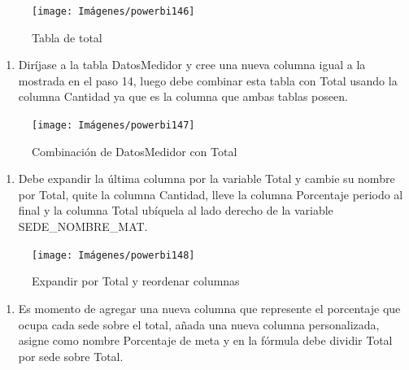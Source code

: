 \documentclass[
]{book}
\providecommand{\tightlist}{%
  \setlength{\itemsep}{0pt}\setlength{\parskip}{0pt}}
\begin{document}
\begin{figure}

{\centering \texttt{[image: Imágenes/powerbi146]} 

}

\caption{Tabla de total}\label{fig:tabladetotal-fig}
\end{figure}

\begin{enumerate}
\def\labelenumi{\arabic{enumi}.}
\setcounter{enumi}{15}
\tightlist
\item
  Diríjase a la tabla DatosMedidor y cree una nueva columna igual a la mostrada en el paso 14, luego debe combinar esta tabla con Total usando la columna Cantidad ya que es la columna que ambas tablas poseen.
\end{enumerate}

\begin{figure}

{\centering \texttt{[image: Imágenes/powerbi147]} 

}

\caption{Combinación de DatosMedidor con Total}\label{fig:combinardatoscontotal-fig}
\end{figure}

\begin{enumerate}
\def\labelenumi{\arabic{enumi}.}
\setcounter{enumi}{16}
\tightlist
\item
  Debe expandir la última columna por la variable Total y cambie su nombre por Total, quite la columna Cantidad, lleve la columna Porcentaje periodo al final y la columna Total ubíquela al lado derecho de la variable SEDE\_NOMBRE\_MAT.
\end{enumerate}

\begin{figure}

{\centering \texttt{[image: Imágenes/powerbi148]} 

}

\caption{Expandir por Total y reordenar columnas}\label{fig:expandirportotal-fig}
\end{figure}

\begin{enumerate}
\def\labelenumi{\arabic{enumi}.}
\setcounter{enumi}{17}
\tightlist
\item
  Es momento de agregar una nueva columna que represente el porcentaje que ocupa cada sede sobre el total, añada una nueva columna personalizada, asigne como nombre Porcentaje de meta y en la fórmula debe dividir Total por sede sobre Total.
\end{enumerate}
\end{document}
